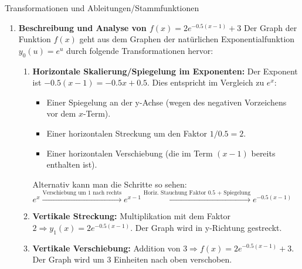 \begin{loesungsumgebung}{Transformationen und Ableitungen/Stammfunktionen}

\begin{enumerate}[label=(\alph*)]
    \item \textbf{Beschreibung und Analyse von $f(x) = 2e^{-0.5(x-1)} + 3$}
    Der Graph der Funktion $f(x)$ geht aus dem Graphen der natürlichen Exponentialfunktion $y_0(u) = e^u$ durch folgende Transformationen hervor:
    \begin{enumerate}
        \item \textbf{Horizontale Skalierung/Spiegelung im Exponenten:} Der Exponent ist $-0.5(x-1) = -0.5x + 0.5$. Dies entspricht im Vergleich zu $e^x$:
        \begin{itemize}
            \item Einer Spiegelung an der y-Achse (wegen des negativen Vorzeichens vor dem $x$-Term).
            \item Einer horizontalen Streckung um den Faktor $1/0.5 = 2$.
            \item Einer horizontalen Verschiebung (die im Term $(x-1)$ bereits enthalten ist).
        \end{itemize}
        Alternativ kann man die Schritte so sehen:
        $e^x \xrightarrow{\text{Verschiebung um 1 nach rechts}} e^{x-1} \xrightarrow{\text{Horiz. Stauchung Faktor 0.5 + Spiegelung}} e^{-0.5(x-1)}$
        \item \textbf{Vertikale Streckung:} Multiplikation mit dem Faktor $2 \Rightarrow y_1(x) = 2e^{-0.5(x-1)}$. Der Graph wird in y-Richtung gestreckt.
        \item \textbf{Vertikale Verschiebung:} Addition von $3 \Rightarrow f(x) = 2e^{-0.5(x-1)} + 3$. Der Graph wird um 3 Einheiten nach oben verschoben.
    \end{enumerate}


\end{enumerate}
\end{loesungsumgebung}
